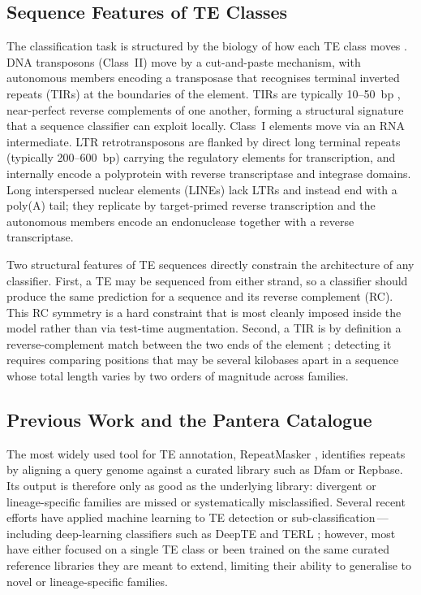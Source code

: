 \documentclass[12pt]{article}
\begin{document}
\subsection{Sequence Features of TE Classes}

The classification task is structured by the biology of how each TE class moves \cite{wicker2007unified,wells2020field}. DNA transposons (Class~II) move by a cut-and-paste mechanism, with autonomous members encoding a transposase that recognises terminal inverted repeats (TIRs) at the boundaries of the element. TIRs are typically 10--50~bp \cite{wicker2007unified}, near-perfect reverse complements of one another, forming a structural signature that a sequence classifier can exploit locally. Class~I elements move via an RNA intermediate. LTR retrotransposons are flanked by direct long terminal repeats (typically 200--600~bp) \cite{wicker2007unified} carrying the regulatory elements for transcription, and internally encode a polyprotein with reverse transcriptase and integrase domains. Long interspersed nuclear elements (LINEs) lack LTRs and instead end with a poly(A) tail; they replicate by target-primed reverse transcription and the autonomous members encode an endonuclease together with a reverse transcriptase.

Two structural features of TE sequences directly constrain the architecture of any classifier. First, a TE may be sequenced from either strand, so a classifier should produce the same prediction for a sequence and its reverse complement (RC). This RC symmetry is a hard constraint that is most cleanly imposed inside the model rather than via test-time augmentation. Second, a TIR is by definition a reverse-complement match between the two ends of the element \cite{wicker2007unified}; detecting it requires comparing positions that may be several kilobases apart in a sequence whose total length varies by two orders of magnitude across families.

\subsection{Previous Work and the Pantera Catalogue}

The most widely used tool for TE annotation, RepeatMasker \cite{smit2015repeatmasker}, identifies repeats by aligning a query genome against a curated library such as Dfam \cite{storer2021dfam} or Repbase. Its output is therefore only as good as the underlying library: divergent or lineage-specific families are missed or systematically misclassified. Several recent efforts have applied machine learning to TE detection or sub-classification\,---\,including deep-learning classifiers such as DeepTE \cite{yan2020deepte} and TERL \cite{requena2021terl}; however, most have either focused on a single TE class or been trained on the same curated reference libraries they are meant to extend, limiting their ability to generalise to novel or lineage-specific families.
\end{document}
